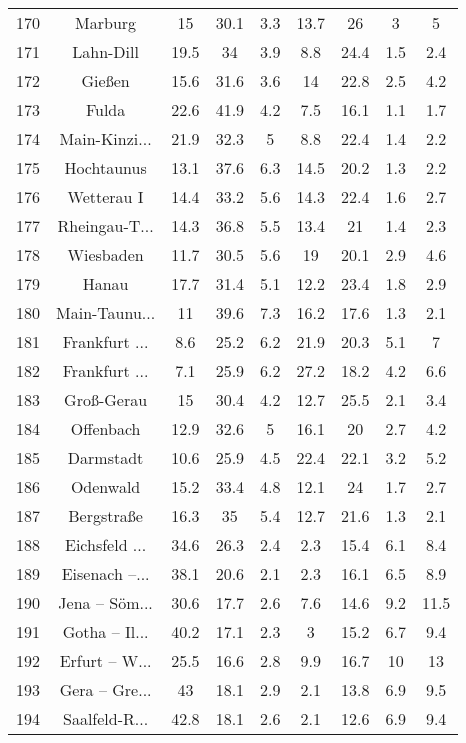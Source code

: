 \begin{table}[!htbp]
\begin{tabular}{@{\extracolsep{5pt}} ccccccccc}
170 & Marburg & 15 & 30.1 & 3.3 & 13.7 & 26 & 3 & 5 \\ 
171 & Lahn-Dill & 19.5 & 34 & 3.9 & 8.8 & 24.4 & 1.5 & 2.4 \\ 
172 & Gießen & 15.6 & 31.6 & 3.6 & 14 & 22.8 & 2.5 & 4.2 \\ 
173 & Fulda & 22.6 & 41.9 & 4.2 & 7.5 & 16.1 & 1.1 & 1.7 \\ 
174 & Main-Kinzi... & 21.9 & 32.3 & 5 & 8.8 & 22.4 & 1.4 & 2.2 \\ 
175 & Hochtaunus & 13.1 & 37.6 & 6.3 & 14.5 & 20.2 & 1.3 & 2.2 \\ 
176 & Wetterau I & 14.4 & 33.2 & 5.6 & 14.3 & 22.4 & 1.6 & 2.7 \\ 
177 & Rheingau-T... & 14.3 & 36.8 & 5.5 & 13.4 & 21 & 1.4 & 2.3 \\ 
178 & Wiesbaden & 11.7 & 30.5 & 5.6 & 19 & 20.1 & 2.9 & 4.6 \\ 
179 & Hanau & 17.7 & 31.4 & 5.1 & 12.2 & 23.4 & 1.8 & 2.9 \\ 
180 & Main-Taunu... & 11 & 39.6 & 7.3 & 16.2 & 17.6 & 1.3 & 2.1 \\ 
181 & Frankfurt ... & 8.6 & 25.2 & 6.2 & 21.9 & 20.3 & 5.1 & 7 \\ 
182 & Frankfurt ... & 7.1 & 25.9 & 6.2 & 27.2 & 18.2 & 4.2 & 6.6 \\ 
183 & Groß-Gerau & 15 & 30.4 & 4.2 & 12.7 & 25.5 & 2.1 & 3.4 \\ 
184 & Offenbach & 12.9 & 32.6 & 5 & 16.1 & 20 & 2.7 & 4.2 \\ 
185 & Darmstadt & 10.6 & 25.9 & 4.5 & 22.4 & 22.1 & 3.2 & 5.2 \\ 
186 & Odenwald & 15.2 & 33.4 & 4.8 & 12.1 & 24 & 1.7 & 2.7 \\ 
187 & Bergstraße & 16.3 & 35 & 5.4 & 12.7 & 21.6 & 1.3 & 2.1 \\ 
188 & Eichsfeld ... & 34.6 & 26.3 & 2.4 & 2.3 & 15.4 & 6.1 & 8.4 \\ 
189 & Eisenach –... & 38.1 & 20.6 & 2.1 & 2.3 & 16.1 & 6.5 & 8.9 \\ 
190 & Jena – Söm... & 30.6 & 17.7 & 2.6 & 7.6 & 14.6 & 9.2 & 11.5 \\ 
191 & Gotha – Il... & 40.2 & 17.1 & 2.3 & 3 & 15.2 & 6.7 & 9.4 \\ 
192 & Erfurt – W... & 25.5 & 16.6 & 2.8 & 9.9 & 16.7 & 10 & 13 \\ 
193 & Gera – Gre... & 43 & 18.1 & 2.9 & 2.1 & 13.8 & 6.9 & 9.5 \\ 
194 & Saalfeld-R... & 42.8 & 18.1 & 2.6 & 2.1 & 12.6 & 6.9 & 9.4 \\ 

\end{tabular}
\end{table}
